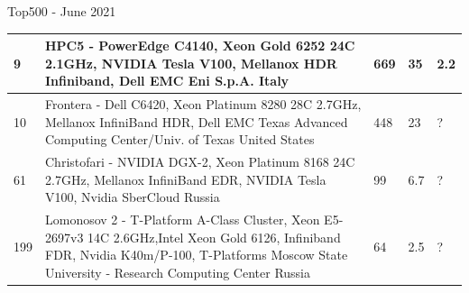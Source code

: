\documentclass{beamer}
\begin{document}
\begin{frame}{Top500 - June 2021}
	\begin{table}
		\centering %
\small		
                \begin{tabular}{p{0.2cm} p{8cm} p{0.7cm} p{0.5cm} p{0.5cm}}
			9 &     	HPC5 - PowerEdge C4140, Xeon Gold 6252 24C 2.1GHz, NVIDIA Tesla V100, Mellanox HDR Infiniband, Dell EMC
Eni S.p.A.  Italy     & 669 & 35 &2.2\\
			\midrule
                            10 &   Frontera - Dell C6420, Xeon Platinum 8280 28C 2.7GHz, Mellanox InfiniBand HDR, Dell EMC Texas Advanced Computing Center/Univ. of Texas United States  & 448 & 23 & ? \\
			\midrule
                            61 &    Christofari - NVIDIA DGX-2, Xeon Platinum 8168 24C 2.7GHz, Mellanox InfiniBand EDR, NVIDIA Tesla V100, Nvidia
SberCloud Russia  & 99 & 6.7 & ?\\
			\midrule
                            199 &     Lomonosov 2 - T-Platform A-Class Cluster, Xeon E5-2697v3 14C 2.6GHz,Intel Xeon Gold 6126, Infiniband FDR, Nvidia K40m/P-100, T-Platforms Moscow State University - Research Computing Center
Russia  & 64 & 2.5 & ? \\
		\end{tabular}
	\end{table}
\end{frame}
\end{document}

